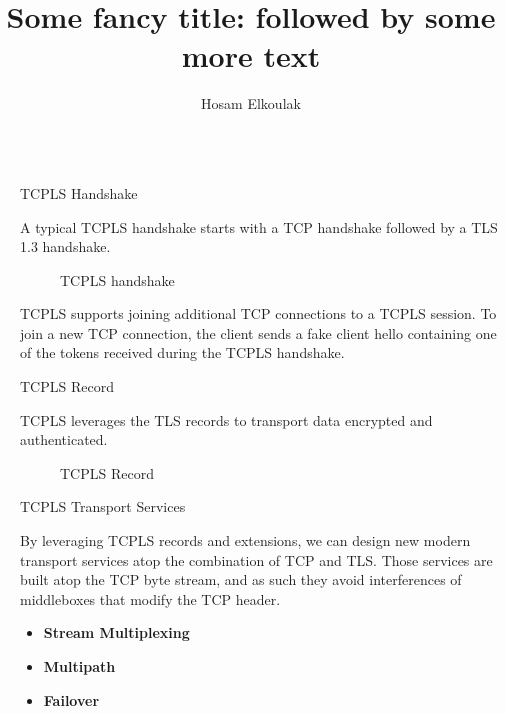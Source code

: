 \documentclass[final]{beamer}
\title{Some fancy title: followed by some more text}
\author{Hosam Elkoulak}
\institute[shortinst]{\inst{1} University of Namur}
\newlength{\sepwidth}
\newlength{\colwidth}
\newcommand{\separatorcolumn}{\begin{column}{\sepwidth}\end{column}}
\begin{document}
  \begin{frame}[t]
    \begin{columns}[t]
      \separatorcolumn

      \begin{column}{\colwidth}

        \begin{block}{TCPLS Handshake}

          A typical TCPLS handshake starts with a TCP handshake followed by a TLS 1.3 handshake.

          \begin{figure}
            \centering
            \caption{TCPLS handshake}
            \label{fig:tcpls-hs}
          \end{figure}

          TCPLS supports joining additional TCP connections to a TCPLS session.
          To join a new TCP connection, the client sends a fake client hello
          containing one of the tokens received during the TCPLS handshake.

        \end{block}

        \begin{block}{TCPLS Record}

          TCPLS leverages the TLS records to transport data encrypted and authenticated.

          \begin{figure}
            \centering
            
            \caption{TCPLS Record}
            \label{fig:tcpls-record}
          \end{figure}


        \end{block}
        \begin{block}{TCPLS Transport Services}

          By leveraging TCPLS records and extensions, we can design new
          modern transport services atop the combination of TCP and TLS. Those services are built atop the TCP
          byte stream, and as such they avoid interferences of middleboxes that modify the TCP header.

          \begin{itemize}
            \item \textbf{Stream Multiplexing}
            \item \textbf{Multipath}
            \item \textbf{Failover}
          \end{itemize}
        \end{block}
        \begin{figure}
          \centering
          
          \label{fig:unamur}
        \end{figure}
        \begin{figure}
          \centering
          
          \label{fig:cyberwal}
        \end{figure}


\end{column}
\end{columns}
\end{frame}
\end{document}
